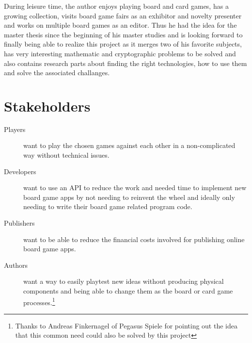 During leisure time, the author enjoys playing board and card games, has a
growing collection, visits board game fairs as an exhibitor and novelty
presenter and works on multiple board games as an editor. Thus he had the idea
for the master thesis since the beginning of his master studies and is looking
forward to finally being able to realize this project as it merges two of his
favorite subjects, has very interesting mathematic and cryptographic problems to
be solved and also contains research parts about finding the right
technologies, how to use them and solve the associated challanges.

\section{Stakeholders}

\begin{description}
  \item[Players] want to play the chosen games against each other in a
  non-complicated way without technical issues.
  \item[Developers] want to use an API to reduce the work and needed time to
  implement new board game apps by not needing to reinvent the wheel and ideally
  only needing to write their board game related program code.
  \item[Publishers] want to be able to reduce the financial costs
  involved for publishing online board game apps.
  \item[Authors] want a way to easily playtest new ideas without producing
  physical components and being able to change them as the board or card game
  processes.\footnote{Thanks to Andreas Finkernagel of Pegasus Spiele for
  pointing out the idea that this common need could also be solved by this
  project}
\end{description}
